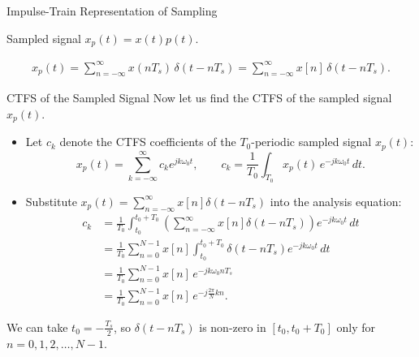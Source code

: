 \begin{frame}{Impulse-Train Representation of Sampling}
\begin{minipage}{0.48\textwidth}
    Sampled signal $x_p(t) = x(t)p(t)$.
  \end{minipage}

  \vspace{0.2cm}
  \begin{align*}
    x_p(t) = \sum_{n=-\infty}^{\infty} x(nT_s)\,\delta(t-nT_s) = \sum_{n=-\infty}^{\infty} x[n]\,\delta(t-nT_s).
  \end{align*}
\end{frame}

\begin{frame}{CTFS of the Sampled Signal}
  Now let us find the CTFS of the sampled signal $x_p(t)$.
  \begin{itemize}
    \item Let $c_k$ denote the CTFS coefficients of the $T_0$-periodic sampled signal $x_p(t)$:
      \begin{equation*}
        x_p(t) = \sum_{k=-\infty}^{\infty} c_k e^{jk\omega_0 t}, \qquad c_k = \frac{1}{T_0}\int_{T_0} x_p(t)\,e^{-jk\omega_0 t}\,dt.
      \end{equation*}
    \item Substitute $x_p(t) = \sum_{n=-\infty}^{\infty} x[n]\delta(t-nT_s)$ into the analysis equation:
      \begin{align*}
        c_k & = \frac{1}{T_0}\int_{t_0}^{ t_0+T_0} \left(\sum_{n=-\infty}^{\infty} x[n]\delta(t-nT_s)\right)e^{-jk\omega_0 t}\,dt \\
        & = \frac{1}{T_0}\sum_{n=0}^{N-1} x[n] \int_{t_0}^{t_0+T_0}\delta(t-nT_s)e^{-jk\omega_0 t}\,dt                        \\
        & = \frac{1}{T_0}\sum_{n=0}^{N-1} x[n]\,e^{-jk\omega_0 nT_s}                                                          \\
        & = \frac{1}{T_0}\sum_{n=0}^{N-1} x[n]\,e^{-j\frac{2\pi}{N}kn}.
      \end{align*}
  \end{itemize}
  {\footnotesize We can take $t_0 = -\frac{T_s}{2}$, so $\delta(t-nT_s)$ is non-zero in $[t_0, t_0+T_0]$ only for $n=0,1,2,\dots,N-1$.}
\end{frame}

